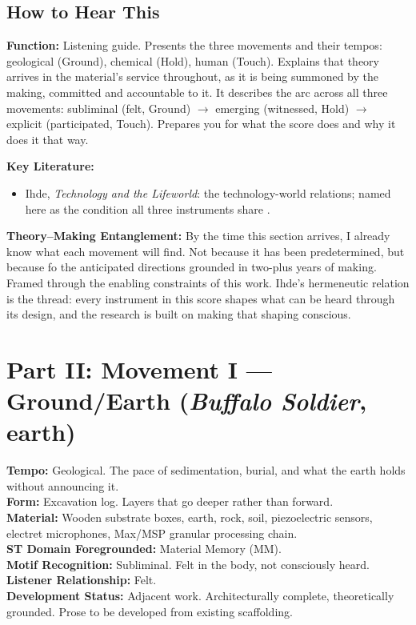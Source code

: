 \bigskip

\subsection*{How to Hear This}

\noindent\textbf{Function:} Listening guide. Presents the three movements and their tempos: geological (Ground), chemical (Hold), human (Touch). Explains that theory arrives in the material's service throughout, as it is being summoned by the making, committed and accountable to it. It describes the arc across all three movements: subliminal (felt, Ground) $\to$ emerging (witnessed, Hold) $\to$ explicit (participated, Touch). Prepares you for what the score does and why it does it that way.

\noindent\textbf{Key Literature:}
\begin{itemize}[noitemsep]
    \item Ihde, \textit{Technology and the Lifeworld}: the technology-world relations; named here as the condition all three instruments share \parencite{Ihde_1990}.
\end{itemize}

\noindent\textbf{Theory--Making Entanglement:} By the time this section arrives, I already know what each movement will find. Not because it has been predetermined, but because fo the anticipated directions grounded in two-plus years of making. Framed through the enabling constraints of this work. Ihde's hermeneutic relation is the thread: every instrument in this score shapes what can be heard through its design, and the research is built on making that shaping conscious.

\bigskip


\section*{Part II: Movement I --- Ground/Earth (\textit{Buffalo Soldier}, earth)}

\noindent\textbf{Tempo:} Geological. The pace of sedimentation, burial, and what the earth holds without announcing it.\\
\noindent\textbf{Form:} Excavation log. Layers that go deeper rather than forward.\\
\noindent\textbf{Material:} Wooden substrate boxes, earth, rock, soil, piezoelectric sensors, electret microphones, Max/MSP granular processing chain.\\
\noindent\textbf{ST Domain Foregrounded:} Material Memory (MM).\\
\noindent\textbf{Motif Recognition:} Subliminal. Felt in the body, not consciously heard.\\
\noindent\textbf{Listener Relationship:} Felt.\\
\noindent\textbf{Development Status:} Adjacent work. Architecturally complete, theoretically grounded. Prose to be developed from existing scaffolding.

